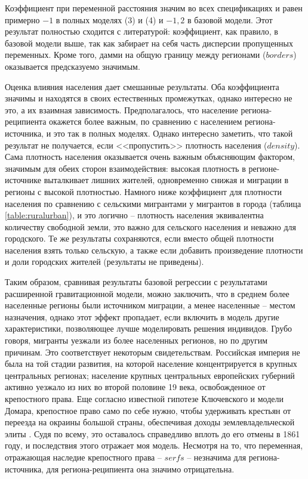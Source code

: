\documentclass[a4paper,12pt]{article}
\begin{document}
Коэффициент при переменной расстояния значим во всех спецификациях и равен примерно $-1$ в полных моделях (3) и (4) и $-1,2$ в базовой модели. Этот результат полностью сходится с литературой: коэффициент, как правило, в базовой модели выше, так как забирает на себя часть дисперсии пропущенных переменных.  Кроме того, дамми на общую границу между регионами ($borders$) оказывается предсказуемо значимым. 

\afterpage{%
	
}\par

Оценка влияния населения дает смешанные результаты. Оба коэффициента значимы и находятся в своих естественных промежутках, однако интересно не это, а их взаимная зависимость. Предполагалось, что население региона-реципиента окажется более важным, по сравнению с населением региона-источника, и это так в полных моделях. Однако интересно заметить, что такой результат не получается, если <<пропустить>> плотность населения ($density$). Сама плотность населения оказывается очень важным объясняющим фактором, значимым для обеих сторон взаимодействия: высокая плотность в регионе-источнике выталкивает лишних жителей, одновременно снижая и миграции в регионы с высокой плотностью. 
Намного ниже коэффициент для плотности населения по сравнению с сельскими мигрантами у мигрантов в города (таблица \ref{table:ruralurban}), и это логично -- плотность населения эквивалентна количеству свободной земли, это важно для сельского населения и неважно для городского.
Те же результаты сохраняются, если вместо общей плотности населения взять только сельскую, а также если добавить произведение плотности и доли городских жителей (результаты не приведены).

Таким образом, сравнивая результаты базовой регрессии с результатами расширенной гравитационной модели, можно заключить, что в среднем более населенные регионы были источником миграции, а менее населенные -- местом назначения, однако этот эффект пропадает, если включить в модель другие характеристики, позволяющее лучше моделировать решения индивидов. Грубо говоря, мигранты уезжали из более населенных регионов, но по другим причинам.
Это соответствует некоторым свидетельствам. 
Российская империя не была на той стадии развития, на которой население концентрируется в крупных центральных регионах; население крупных центральных европейских губерний активно уезжало из них во второй половине 19 века, освобожденное от крепостного права. Еще согласно известной гипотезе Ключевского и модели Домара, крепостное право само по себе нужно, чтобы удерживать крестьян от переезда на окраины большой страны, обеспечивая доходы землевладельческой элиты \citep{domar_causes_1970}. Судя по всему, это оставалось справедливо вплоть до его отмены в 1861 году, и последствия этого отражает моя модель. Несмотря на то, что переменная, отражающая наследие крепостного права -- $serfs$ -- незначима для региона-источника, для региона-реципиента она значимо отрицательна. 
\end{document}
